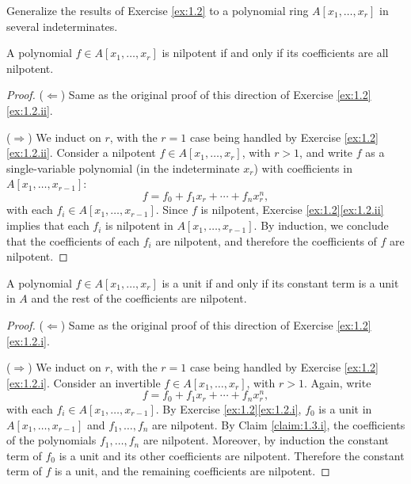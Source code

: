 \begin{exercise}
\label{ex:1.3}
Generalize the results of Exercise \ref{ex:1.2} to a polynomial ring $A[x_1,\ldots,x_r]$ in several indeterminates.
\end{exercise}




\begin{claim}
\label{claim:1.3.ii}
A polynomial $f\in A[x_1,\ldots,x_r]$ is nilpotent if and only if its coefficients are all nilpotent.
\end{claim}

\begin{proof}
($\Leftarrow$)
Same as the original proof of this direction of Exercise \ref{ex:1.2}\ref{ex:1.2.ii}.

($\Rightarrow$)
We induct on $r$, with the $r=1$ case being handled by Exercise \ref{ex:1.2}\ref{ex:1.2.ii}.
Consider a nilpotent $f \in A[x_1,\ldots,x_r]$, with $r > 1$, and write $f$ as a single-variable polynomial (in the indeterminate $x_r$) with coefficients in $A[x_1,\ldots,x_{r-1}]$:
\begin{equation*}
f = f_0 + f_1 x_r + \cdots + f_n x_r^n,
\end{equation*}
with each $f_i \in A[x_1,\ldots,x_{r-1}]$.
Since $f$ is nilpotent, Exercise \ref{ex:1.2}\ref{ex:1.2.ii} implies that each $f_i$ is nilpotent in $A[x_1,\ldots,x_{r-1}]$.
By induction, we conclude that the coefficients of each $f_i$ are nilpotent, and therefore the coefficients of $f$ are nilpotent.
\end{proof}


\begin{claim}
\label{claim:1.3.i}
A polynomial $f\in A[x_1,\ldots,x_r]$ is a unit if and only if its constant term is a unit in $A$ and the rest of the coefficients are nilpotent.
\end{claim}

\begin{proof}
($\Leftarrow$)
Same as the original proof of this direction of Exercise \ref{ex:1.2}\ref{ex:1.2.i}.

($\Rightarrow$)
We induct on $r$, with the $r=1$ case being handled by Exercise \ref{ex:1.2}\ref{ex:1.2.i}.
Consider an invertible $f \in A[x_1,\ldots,x_r]$, with $r > 1$.
Again, write
\begin{equation*}
f = f_0 + f_1 x_r + \cdots + f_n x_r^n,
\end{equation*}
with each $f_i \in A[x_1,\ldots,x_{r-1}]$.
By Exercise \ref{ex:1.2}\ref{ex:1.2.i}, $f_0$ is a unit in $A[x_1,\ldots,x_{r-1}]$ and $f_1,\ldots,f_n$ are nilpotent.
By Claim \ref{claim:1.3.i}, the coefficients of the polynomials $f_1,\ldots,f_n$ are nilpotent.
Moreover, by induction the constant term of $f_0$ is a unit and its other coefficients are nilpotent.
Therefore the constant term of $f$ is a unit, and the remaining coefficients are nilpotent.
\end{proof}


